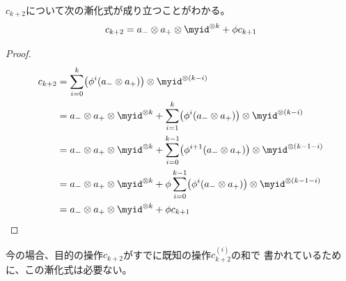 	$c_{k+2}$について次の漸化式が成り立つことがわかる。
	\begin{equation}\label{eq:cの漸化式}\begin{split} %
		c_{k+2} = a_-\otimes a_+\otimes\myid^{\otimes k} + \phi c_{k+1}
	\end{split}\end{equation} %
	\begin{proof} %
		\begin{equation*}\begin{split} %
			c_{k+2} &= \sum_{i=0}^k
				\bigl(\phi^i(a_-\otimes a_+)\bigr)\otimes\myid^{\otimes(k-i)} \\
			&= a_-\otimes a_+\otimes\myid^{\otimes k}
				+ \sum_{i=1}^k
				\bigl(\phi^i(a_-\otimes a_+)\bigr)\otimes\myid^{\otimes(k-i)} \\
			&= a_-\otimes a_+\otimes\myid^{\otimes k}
				+ \sum_{i=0}^{k-1} \bigl(\phi^{i+1}(a_-\otimes a_+)\bigr)
				\otimes\myid^{\otimes(k-1-i)} \\
			&= a_-\otimes a_+\otimes\myid^{\otimes k}
				+ \phi\sum_{i=0}^{k-1} \bigl(\phi^{i}(a_-\otimes a_+)\bigr)
				\otimes\myid^{\otimes(k-1-i)} \\
			&= a_-\otimes a_+\otimes\myid^{\otimes k} + \phi c_{k+1} \\
		\end{split}\end{equation*} %
	\end{proof} %
	今の場合、目的の操作$c_{k+2}$がすでに既知の操作$c_{k+2}^{(i)}$の和で
	書かれているために、この漸化式は必要ない。

